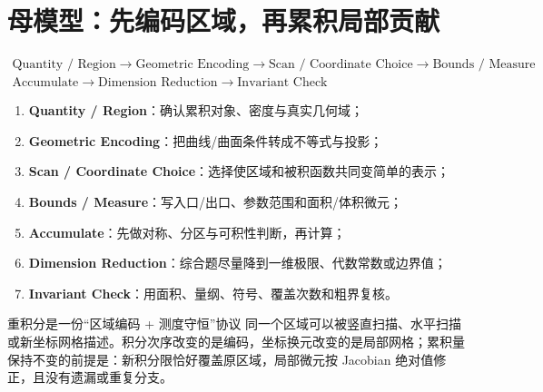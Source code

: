 \documentclass[11pt,a4paper,fontset=fandol]{ctexart}
\newcommand{\kw}[1]{\textbf{\color{deep}#1}}
\begin{document}
\section{母模型：先编码区域，再累积局部贡献}

\[
\boxed{\begin{gathered}
\text{Quantity / Region}
\to\text{Geometric Encoding}
\to\text{Scan / Coordinate Choice}
\to\text{Bounds / Measure}\\
\text{Accumulate}
\to\text{Dimension Reduction}
\to\text{Invariant Check}
\end{gathered}}
\]

\begin{enumerate}
  \item \kw{Quantity / Region}：确认累积对象、密度与真实几何域；
  \item \kw{Geometric Encoding}：把曲线/曲面条件转成不等式与投影；
  \item \kw{Scan / Coordinate Choice}：选择使区域和被积函数共同变简单的表示；
  \item \kw{Bounds / Measure}：写入口/出口、参数范围和面积/体积微元；
  \item \kw{Accumulate}：先做对称、分区与可积性判断，再计算；
  \item \kw{Dimension Reduction}：综合题尽量降到一维极限、代数常数或边界值；
  \item \kw{Invariant Check}：用面积、量纲、符号、覆盖次数和粗界复核。
\end{enumerate}

\begin{corebox}{重积分是一份“区域编码 + 测度守恒”协议}
同一个区域可以被竖直扫描、水平扫描或新坐标网格描述。积分次序改变的是编码，坐标换元改变的是局部网格；累积量保持不变的前提是：新积分限恰好覆盖原区域，局部微元按 Jacobian 绝对值修正，且没有遗漏或重复分支。
\end{corebox}

\begin{center}
\end{center}
\end{document}

